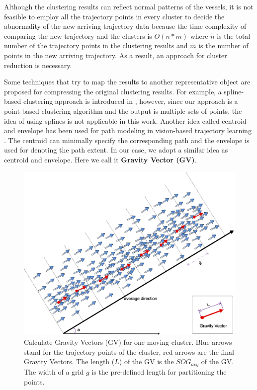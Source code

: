 \documentclass[12pt,glossary]{dalcsthesis}
\begin{document}
Although the clustering results can reflect normal patterns of the vessels, it is not feasible to employ all the trajectory points in every cluster to decide the abnormality of the new arriving trajectory data because the time complexity of comparing the new trajectory and the clusters is $O(n*m)$ where $n$ is the total number of the trajectory points in the clustering results and $m$ is the number of points in the new arriving trajectory. As a result, an approach for cluster reduction is necessary.

Some techniques \cite{spline}\cite{visionsurvey} that try to map the results to another representative object are proposed for compressing the original clustering results. For example, a spline-based clustering approach is introduced in \cite{spline}, however, since our approach is a point-based clustering algorithm and the output is multiple sets of points, the idea of using splines is not applicable in this work. Another idea called centroid and envelope has been used for path modeling in vision-based trajectory learning \cite{visionsurvey}. The centroid can minimally specify the corresponding path and the envelope is used for denoting the path extent. In our case, we adopt a similar idea as centroid and envelope. Here we call it \textbf{Gravity Vector (GV)}. 


\begin{figure}[!htb]
\centering
\includegraphics[width=6in]{gravityCalculation.png}%
\caption{Calculate Gravity Vectors (GV) for one moving cluster. Blue arrows stand for the trajectory points of the cluster, red arrows are the final Gravity Vectors. The length ($L$) of the GV is the $SOG_{avg}$ of the GV. The width of a grid $g$ is the pre-defined length for partitioning the points.}
\label{fig:gravityPoint}
\end{figure}
\end{document}

